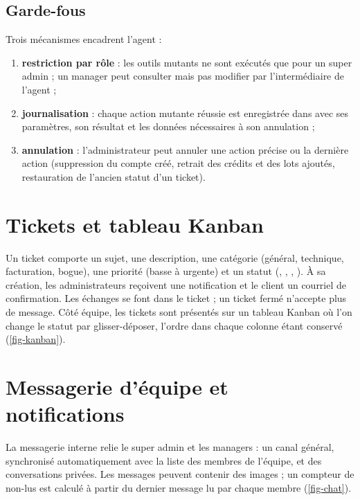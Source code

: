 \subsection{Garde-fous}
Trois mécanismes encadrent l'agent :
\begin{enumerate}
  \item \textbf{restriction par rôle} : les outils mutants ne sont exécutés que pour un super admin ; un manager peut consulter mais pas modifier par l'intermédiaire de l'agent ;
  \item \textbf{journalisation} : chaque action mutante réussie est enregistrée dans  avec ses paramètres, son résultat et les données nécessaires à son annulation ;
  \item \textbf{annulation} : l'administrateur peut annuler une action précise ou la dernière action (suppression du compte créé, retrait des crédits et des lots ajoutés, restauration de l'ancien statut d'un ticket).
\end{enumerate}


\section{Tickets et tableau Kanban}
Un ticket comporte un sujet, une description, une catégorie (général, technique, facturation, bogue), une priorité (basse à urgente) et un statut (, , , ). À sa création, les administrateurs reçoivent une notification et le client un courriel de confirmation. Les échanges se font dans le ticket ; un ticket fermé n'accepte plus de message. Côté équipe, les tickets sont présentés sur un tableau Kanban où l'on change le statut par glisser-déposer, l'ordre dans chaque colonne étant conservé (\cref{fig-kanban}).


\section{Messagerie d'équipe et notifications}
La messagerie interne relie le super admin et les managers : un canal général, synchronisé automatiquement avec la liste des membres de l'équipe, et des conversations privées. Les messages peuvent contenir des images ; un compteur de non-lus est calculé à partir du dernier message lu par chaque membre (\cref{fig-chat}).

